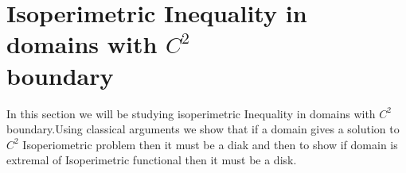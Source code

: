 \documentclass[oneside]{book}
\begin{document}
\section{Isoperimetric Inequality in domains with $C^{2}$ \\boundary} 
\label{s:3}
In this section we will be studying isoperimetric Inequality in domains with $C^{2}$ boundary.Using classical arguments we show that if a domain gives a solution to $C^{2}$  Isoperiometric problem then it must be a diak and then to show if domain is extremal of Isoperimetric functional then it must be a disk.
\end{document}
